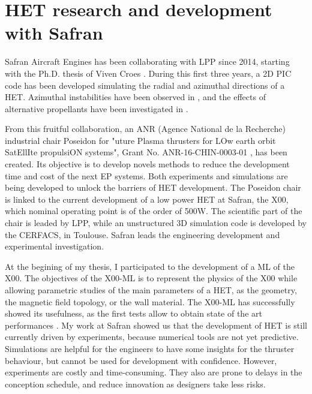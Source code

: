 

\section*{\ac{HET} research and development with Safran}
\label{sec-poseidon}



Safran Aircraft Engines has been collaborating with \ac{LPP} since 2014, starting with the Ph.D. thesis of Viven Croes \citep{croes2017}.
During this first three years, a \ac{2D} \ac{PIC} code has been developed simulating the radial and azimuthal directions of a \ac{HET}.
Azimuthal instabilities have been observed in \citet{croes2017a}, and the effects of alternative propellants have been investigated in \citet{croes2018}.

From this fruitful collaboration, an ANR (Agence National de la Recherche) industrial chair {\sc Poseidon} for  "uture Plasma thrusters for LOw earth orbit SatEllIte propulsiON systems", Grant No. ANR-16-CHIN-0003-01 , has been created.
Its objective is to develop novels methods to reduce the development time and cost of the next \ac{EP} systems.
Both experiments and simulations are being developed to unlock the barriers of \ac{HET} development.
The {\sc Poseidon} chair is linked to the current development of a  low power \ac{HET} at Safran, the \PPS X00, which nominal operating point is of the order of 500W.
The scientific part of the chair is leaded by \ac{LPP}, while an unstructured \ac{3D} simulation code is developed by the CERFACS, in Toulouse.
Safran leads the engineering development and experimental investigation.

At the begining of my thesis, I participated to the development of a \ac{ML} of the \PPS X00.
The objectives of the \PPS X00-\ac{ML}  is to represent the physics of the \PPS X00 while allowing parametric studies of the main parameters of a \ac{HET}, as the geometry, the magnetic field topology, or the wall material.
The \PPS X00-\ac{ML} has successfully showed its usefulness, as the first tests allow to obtain state of the art performances \citep{vaudolon2018}.
My work at Safran showed us that the development of \ac{HET} is still currently driven by experiments, because numerical tools are not yet predictive.
Simulations are helpful for the engineers to have some insights for the thruster behaviour, but cannot be used for development with confidence.
However, experiments are costly and time-consuming.
They also are prone to delays in the conception schedule, and reduce innovation as designers take less risks.

